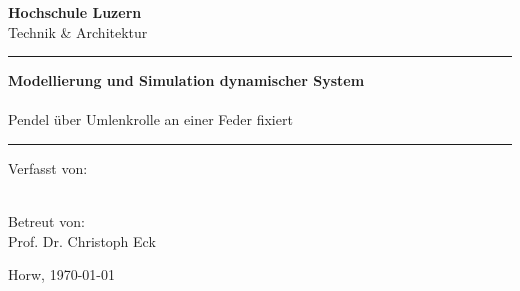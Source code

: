 \begin{titlepage}
    \begin{center}
        \textbf{\huge{Hochschule Luzern}}\\
        \vspace{2mm}
        \large{Technik \& Architektur}\\
        \vspace{5mm}
    \end{center}

    \vspace{0mm}

    \begin{center}
    \end{center} 

    \vspace{2mm}

    \begin{center}
        \rule{\textwidth}{2pt}
    \end{center}

    \begin{center}
      \textbf{\huge{Modellierung und Simulation dynamischer System}}\\
        \vspace{2mm}
        \Large{\makeatletter \@title  \makeatother}\\
        \vspace{2mm}
        \large{Pendel über Umlenkrolle an einer Feder fixiert}
    \end{center}

    \begin{center}
        \rule{\textwidth}{2pt}
    \end{center}


    \begin{minipage}{0.7\textwidth}
        \begin{flushleft}
            Verfasst von:\\
            \large{\makeatletter \@author \makeatother}\\
            \vspace{4mm}
        \end{flushleft}
    \end{minipage}
    \begin{minipage}{0.3\textwidth}
        \begin{flushright}
            Betreut von:\\
            \large{Prof. Dr. Christoph Eck}
            \vspace{1mm}
        \end{flushright}
    \end{minipage}

	\vspace*{\fill}
    \begin{center}
        Horw, \today
    \end{center}

\end{titlepage}
\clearpage